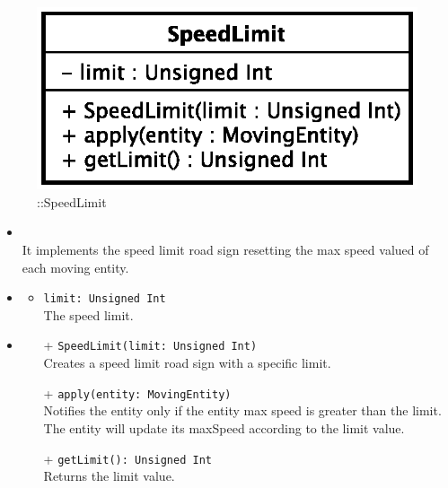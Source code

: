 \begin{figure}[h]
\centering
\includegraphics[scale=0.6,keepaspectratio]{images/solution/app/backend/speed_limit.eps}
\caption{\pPassive::SpeedLimit}
\label{fig:sd-app-speed_limit}
\end{figure}
\FloatBarrier
\begin{itemize}
  \item \textbf{\descr} \\
It implements the speed limit road sign resetting the max speed valued of each moving entity.
  \item \textbf{\attrs}
  \begin{itemize}
    \item \texttt{limit: Unsigned Int} \\
The speed limit.
  \end{itemize}
  \item \textbf{\ops}
  \begin{itemize} 
  \item[+] \texttt{SpeedLimit(limit: Unsigned Int)} \\
Creates a speed limit road sign with a specific limit.    
  \item[+] \texttt{apply(entity: MovingEntity)} \\
Notifies the entity only if the entity max speed is greater than the limit.
The entity will update its maxSpeed according to the limit value.
  \item[+] \texttt{getLimit(): Unsigned Int} \\
Returns the limit value.
  \end{itemize}
\end{itemize}
